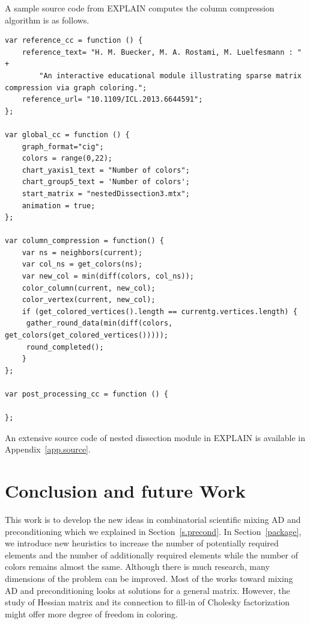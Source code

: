 \documentclass[12pt, twoside,a4paper,toc=bibliography]{scrbook}
\newcommand{\secref}[1]{Section~\protect\ref{#1}}
\newcommand{\appref}[1]{Appendix~\protect\ref{#1}}
\begin{document}
A sample source code from EXPLAIN computes the column compression algorithm is as follows.
\begin{lstlisting}
var reference_cc = function () {
    reference_text= "H. M. Buecker, M. A. Rostami, M. Luelfesmann : " +
        "An interactive educational module illustrating sparse matrix compression via graph coloring.";
    reference_url= "10.1109/ICL.2013.6644591";
};

var global_cc = function () {
    graph_format="cig";
    colors = range(0,22);
    chart_yaxis1_text = "Number of colors";
    chart_group5_text = 'Number of colors';
    start_matrix = "nestedDissection3.mtx";
    animation = true;
};

var column_compression = function() {
    var ns = neighbors(current);
    var col_ns = get_colors(ns);
    var new_col = min(diff(colors, col_ns));
    color_column(current, new_col);
    color_vertex(current, new_col);
    if (get_colored_vertices().length == currentg.vertices.length) {
     gather_round_data(min(diff(colors, get_colors(get_colored_vertices()))));
     round_completed();
    }
};

var post_processing_cc = function () {

};
\end{lstlisting}
An extensive source code of nested dissection module in EXPLAIN is available in \appref{app.source}.
\chapter{Conclusion and future Work}
\label{conc}
This work is to develop the new ideas in combinatorial scientific mixing AD and preconditioning which we explained in \secref{s.precond}.
In \secref{package}, we introduce new heuristics to increase the number of potentially required elements and the number of additionally required
elements while the number of colors remains almost the same.
Although there is much research, many dimensions of the problem can be improved. Most of the works toward mixing AD and preconditioning looks at solutions for a general matrix. However, the study of Hessian matrix and its connection to fill-in of Cholesky factorization might offer more degree of freedom in coloring.
\end{document}
